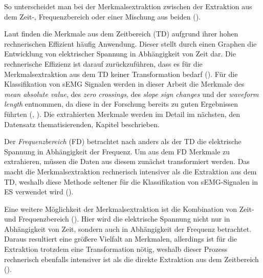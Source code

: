 So unterscheidet man bei der Merkmalsextraktion zwischen der Extraktion aus dem Zeit-, Frequenzbereich oder einer Mischung aus beiden (\cite{zecca2002control}).

Laut \cite{zecca2002control} finden die Merkmale aus dem Zeitbereich (TD) aufgrund ihrer hohen rechnerischen Effizient häufig Anwendung. Dieser stellt durch einen Graphen die Entwicklung von elektrischer Spannung in Abhängigkeit von Zeit dar. Die rechnerische Effizienz ist darauf zurückzuführen, dass es für die Merkmalsextraktion aus dem TD keiner Transformation bedarf (\cite{zecca2002control}). Für die Klassifikation von sEMG Signalen werden in dieser Arbeit die Merkmale des \textit{mean absolute value}, des \textit{zero crossings}, des \textit{slope sign changes} und der \textit{waveform length} entnommen, da diese in der Forschung bereits zu guten Ergebnissen führten (\cite{Engelhart2003}, \cite{Kaufmann2013}). Die extrahierten Merkmale werden im Detail im nächsten, den Datensatz thematisierenden, Kapitel beschrieben.

Der \textit{Frequenzbereich} (FD) betrachtet nach \cite{zecca2002control} anders als der TD die elektrische Spannung in Abhängigkeit der Frequenz. Um aus dem FD Merkmale zu extrahieren, müssen die Daten aus diesem zunächst transformiert werden. Das macht die Merkmalsextraktion rechnerisch intensiver als die Extraktion aus dem TD, weshalb diese Methode seltener für die Klassifikation von sEMG-Signalen in ES verwendet wird (\cite{zecca2002control}).

Eine weitere Möglichkeit der Merkmalsextraktion ist die Kombination von Zeit- und Frequenzbereich (\cite{zecca2002control}).
Hier wird die elektrische Spannung nicht nur in Abhängigkeit von Zeit, sondern auch in Abhängigkeit der Frequenz betrachtet. Daraus resultiert eine größere Vielfalt an Merkmalen, allerdings ist für die Extraktion trotzdem eine Transformation nötig, weshalb dieser Prozess rechnerisch ebenfalls intensiver ist als die direkte Extraktion aus dem Zeitbereich (\cite{zecca2002control}). 